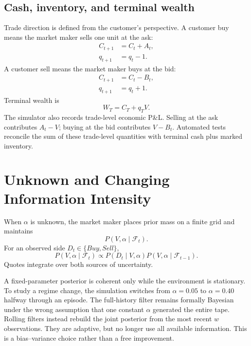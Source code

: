 \documentclass[11pt]{article}
\begin{document}
\subsection{Cash, inventory, and terminal wealth}

Trade direction is defined from the customer's perspective. A customer buy means the market maker sells one unit at the ask:
\begin{align}
C_{t+1}&=C_t+A_t, \\
q_{t+1}&=q_t-1.
\end{align}
A customer sell means the market maker buys at the bid:
\begin{align}
C_{t+1}&=C_t-B_t, \\
q_{t+1}&=q_t+1.
\end{align}
Terminal wealth is
\begin{equation}
W_T=C_T+q_TV.
\end{equation}
The simulator also records trade-level economic P\&L. Selling at the ask contributes $A_t-V$; buying at the bid contributes $V-B_t$. Automated tests reconcile the sum of these trade-level quantities with terminal cash plus marked inventory.

\section{Unknown and Changing Information Intensity}

When $\alpha$ is unknown, the market maker places prior mass on a finite grid and maintains
\begin{equation}
P(V,\alpha\mid\mathcal{F}_t).
\end{equation}
For an observed side $D_t\in\{Buy,Sell\}$,
\begin{equation}
P(V,\alpha\mid\mathcal{F}_{t})
\propto
P(D_t\mid V,\alpha)
P(V,\alpha\mid\mathcal{F}_{t-1}).
\end{equation}
Quotes integrate over both sources of uncertainty.

A fixed-parameter posterior is coherent only while the environment is stationary. To study a regime change, the simulation switches from $\alpha=0.05$ to $\alpha=0.40$ halfway through an episode. The full-history filter remains formally Bayesian under the wrong assumption that one constant $\alpha$ generated the entire tape. Rolling filters instead rebuild the joint posterior from the most recent $w$ observations. They are adaptive, but no longer use all available information. This is a bias--variance choice rather than a free improvement.
\end{document}
